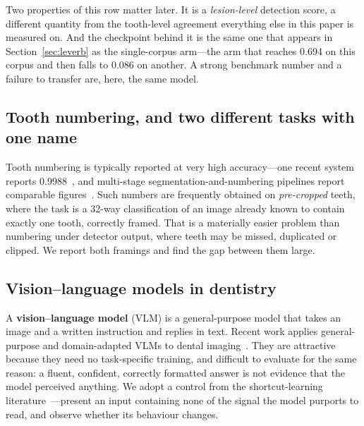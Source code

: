 \documentclass[conference]{IEEEtran}
\begin{document}
Two properties of this row matter later. It is a \emph{lesion-level} detection
score, a different quantity from the tooth-level agreement everything else in this
paper is measured on. And the checkpoint behind it is the same one that appears in
Section~\ref{sec:leverb} as the single-corpus arm---the arm that reaches 0.694 on
this corpus and then falls to 0.086 on another. A strong benchmark number and a
failure to transfer are, here, the same model.

\subsection{Tooth numbering, and two different tasks with one name}
Tooth numbering is typically reported at very high accuracy---one recent system
reports 0.9988~\cite{zancan2025ai}, and multi-stage segmentation-and-numbering
pipelines report comparable figures~\cite{zhang2025reliable}. Such numbers are
frequently obtained on \emph{pre-cropped} teeth, where the task is a 32-way
classification of an image already known to contain exactly one tooth, correctly
framed. That is a materially easier problem than numbering under detector
output, where teeth may be missed, duplicated or clipped. We report both
framings and find the gap between them large.

\subsection{Vision--language models in dentistry}
A \textbf{vision--language model} (VLM) is a general-purpose model that takes an
image and a written instruction and replies in text. Recent work applies
general-purpose and domain-adapted VLMs to dental
imaging~\cite{meng2026dentvlm,jha2026dentiask,li2026pandent,hao2025mmoral}.
They are attractive because they need no task-specific training, and difficult
to evaluate for the same reason: a fluent, confident, correctly formatted answer
is not evidence that the model perceived anything. We adopt a control from the
shortcut-learning literature~\cite{geirhos2020shortcut}---present an input
containing none of the signal the model purports to read, and observe whether
its behaviour changes.
\end{document}
